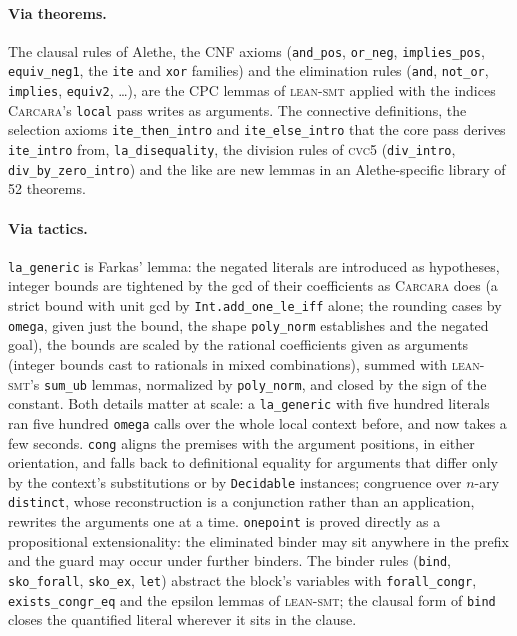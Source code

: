 \documentclass[runningheads]{llncs}
\newcommand{\cvcv}{\textsc{cvc5}\xspace}
\newcommand{\tactic}{\textsc{lean-smt}\xspace}
\newcommand{\carcara}{\textsc{Carcara}\xspace}
\newcommand{\alethe}{Alethe\xspace}
\newcommand{\cpc}{CPC\xspace}
\newcommand{\rulename}[1]{\texttt{#1}}
\begin{document}
\paragraph{Via theorems.} The clausal rules of \alethe, the CNF axioms
(\rulename{and\_pos}, \rulename{or\_neg}, \rulename{implies\_pos},
\rulename{equiv\_neg1}, the \texttt{ite} and \texttt{xor} families) and the
elimination rules (\rulename{and}, \rulename{not\_or}, \rulename{implies},
\rulename{equiv2}, \ldots), are the \cpc lemmas of \tactic applied with the
indices \carcara's \texttt{local} pass writes as arguments. The connective
definitions, the selection axioms \rulename{ite\_then\_intro} and
\rulename{ite\_else\_intro} that the core pass derives \rulename{ite\_intro}
from, \rulename{la\_disequality}, the division rules of \cvcv
(\rulename{div\_intro}, \rulename{div\_by\_zero\_intro}) and the like are new
lemmas in an \alethe-specific library of 52 theorems.

\paragraph{Via tactics.} \rulename{la\_generic} is Farkas' lemma:
the negated literals are introduced as hypotheses, integer bounds are
tightened by the gcd of their coefficients as \carcara does (a strict bound
with unit gcd by \lstinline{Int.add_one_le_iff} alone; the rounding cases
by \texttt{omega}, given just the bound, the shape \texttt{poly\_norm}
establishes and the negated goal), the bounds are scaled by the rational
coefficients given as arguments (integer bounds cast to rationals in mixed
combinations), summed with \tactic's \texttt{sum\_ub} lemmas, normalized by
\texttt{poly\_norm}, and closed by the sign of the constant. Both details
matter at scale: a \rulename{la\_generic} with five hundred literals ran
five hundred \texttt{omega} calls over the whole local context before, and
now takes a few seconds. \rulename{cong} aligns the
premises with the argument positions, in either orientation, and falls back
to definitional equality for arguments that differ only by the context's
substitutions or by \texttt{Decidable} instances; congruence over
$n$-ary \texttt{distinct}, whose reconstruction is a conjunction rather than
an application, rewrites the arguments one at a time. \rulename{onepoint}
is proved directly as a propositional extensionality: the eliminated binder
may sit anywhere in the prefix and the guard may occur under further
binders. The binder rules (\rulename{bind}, \rulename{sko\_forall},
\rulename{sko\_ex}, \rulename{let}) abstract the block's variables with
\lstinline{forall_congr}, \lstinline{exists_congr_eq} and the epsilon lemmas
of \tactic; the clausal form of \rulename{bind} closes the quantified
literal wherever it sits in the clause.
\end{document}
